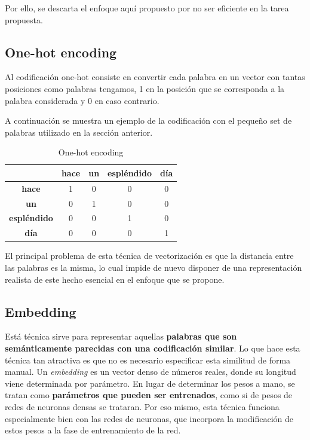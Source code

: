 \documentclass[12pt,a4paper, xcolor=table]{article}
\begin{document}
Por ello, se descarta el enfoque aquí propuesto por no ser eficiente en la tarea propuesta.

\subsection{One-hot encoding}
Al codificación one-hot consiste en convertir cada palabra en un vector con tantas posiciones como palabras tengamos, 1 en la posición que se corresponda a la palabra considerada y 0 en caso contrario.

\vspace{2mm}

A continuación se muestra un ejemplo de la codificación con el pequeño set de palabras utilizado en la sección anterior.

  \begin{table}[h]
        \centering
        \begin{tabular}{|c|c|c|c|c|}
        \hline
        \textbf{} &\textbf{hace} & \textbf{un} & \textbf{espléndido} & \textbf{día}  \\ \hline
        \textbf{hace}                     & 1 & 0 & 0 & 0\\ \hline
        \textbf{un}                       & 0 & 1 & 0 & 0\\ \hline
        \textbf{espléndido}               & 0 & 0 & 1 & 0\\ \hline
        \textbf{día}                      & 0 & 0 & 0 & 1\\ \hline
        \end{tabular}
        \caption{One-hot encoding}
            \label{fig:graf_exp1}
    \end{table}

\vspace{2mm}

El principal problema de esta técnica de vectorización es que la distancia entre las palabras es la misma, lo cual impide de nuevo disponer de una representación realista de este hecho esencial en el enfoque que se propone.

\subsection{Embedding}

Está técnica sirve para representar aquellas \textbf{palabras que son semánticamente parecidas con una codificación similar}. Lo que hace esta técnica tan atractiva es que no es necesario especificar esta similitud de forma manual. Un \textit{embedding} es un vector denso de números reales, donde su longitud viene determinada por parámetro. En lugar de determinar los pesos a mano, se tratan como \textbf{parámetros que pueden ser entrenados}, como si de pesos de redes de neuronas densas se trataran. Por eso mismo, esta técnica funciona especialmente bien con las redes de neuronas, que incorpora la modificación de estos pesos a la fase de entrenamiento de la red.
\end{document}
